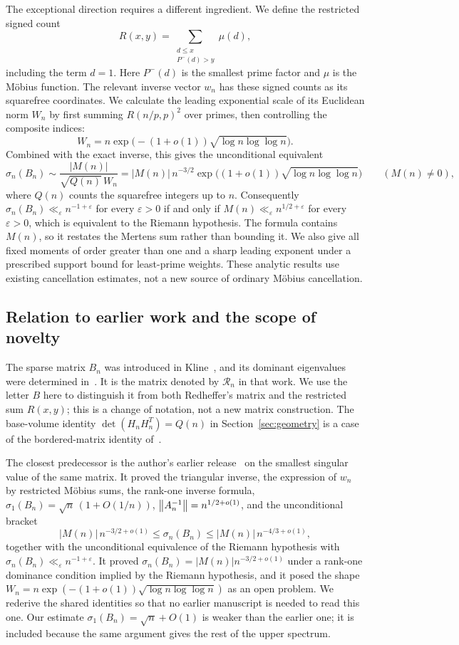 The exceptional direction requires a different ingredient. We define the restricted signed count
\[
 R(x,y)=\sum_{\substack{d\le x\\P^-(d)>y}}\mu(d),
\]
including the term $d=1$. Here $P^-(d)$ is the smallest prime factor and $\mu$ is the M\"obius function. The relevant inverse vector $w_n$ has these signed counts as its squarefree coordinates. We calculate the leading exponential scale of its Euclidean norm $W_n$ by first summing $R(n/p,p)^2$ over primes, then controlling the composite indices:
\[
 W_n=n\exp\bigl(-(1+o(1))\sqrt{\log n\log\log n}\bigr).
\]
Combined with the exact inverse, this gives the unconditional equivalent
\[
 \sigma_n(B_n)\sim\frac{|M(n)|}{\sqrt{Q(n)}\,W_n}
 =|M(n)|\,n^{-3/2}\exp\bigl((1+o(1))\sqrt{\log n\log\log n}\bigr)
 \qquad(M(n)\ne0),
\]
where $Q(n)$ counts the squarefree integers up to $n$. Consequently $\sigma_n(B_n)\ll_\varepsilon n^{-1+\varepsilon}$ for every $\varepsilon>0$ if and only if $M(n)\ll_\varepsilon n^{1/2+\varepsilon}$ for every $\varepsilon>0$, which is equivalent to the Riemann hypothesis. The formula contains $M(n)$, so it restates the Mertens sum rather than bounding it. We also give all fixed moments of order greater than one and a sharp leading exponent under a prescribed support bound for least-prime weights. These analytic results use existing cancellation estimates, not a new source of ordinary M\"obius cancellation.

\subsection{Relation to earlier work and the scope of novelty}

The sparse matrix $B_n$ was introduced in Kline~\cite{kline2019}, and its dominant eigenvalues were determined in~\cite{kline2020}. It is the matrix denoted by $\mathcal R_n$ in that work. We use the letter $B$ here to distinguish it from both Redheffer's matrix and the restricted sum $R(x,y)$; this is a change of notation, not a new matrix construction. The base-volume identity $\det(H_nH_n^T)=Q(n)$ in Section~\ref{sec:geometry} is a case of the bordered-matrix identity of~\cite{kline2020b}.

The closest predecessor is the author's earlier release~\cite{klineSmallest} on the smallest singular value of the same matrix. It proved the triangular inverse, the expression of $w_n$ by restricted M\"obius sums, the rank-one inverse formula, $\sigma_1(B_n)=\sqrt n\,(1+O(1/n))$, $\left\lVert A_n^{-1}\right\rVert=n^{1/2+o(1)}$, and the unconditional bracket
\[
 |M(n)|\,n^{-3/2+o(1)}\le\sigma_n(B_n)\le|M(n)|\,n^{-4/3+o(1)},
\]
together with the unconditional equivalence of the Riemann hypothesis with $\sigma_n(B_n)\ll_\varepsilon n^{-1+\varepsilon}$. It proved $\sigma_n(B_n)=|M(n)|n^{-3/2+o(1)}$ under a rank-one dominance condition implied by the Riemann hypothesis, and it posed the shape $W_n=n\exp(-(1+o(1))\sqrt{\log n\log\log n})$ as an open problem. We rederive the shared identities so that no earlier manuscript is needed to read this one. Our estimate $\sigma_1(B_n)=\sqrt n+O(1)$ is weaker than the earlier one; it is included because the same argument gives the rest of the upper spectrum.

